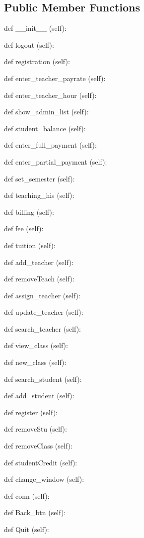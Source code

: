\subsection*{Public Member Functions}
\begin{DoxyCompactItemize}
\item 
def {\_\_init\_\_} (self):
\item 
def {logout} (self):
\item 
def {registration} (self):
\item 
def {enter\_teacher\_payrate} (self):
\item 
def {enter\_teacher\_hour} (self):
\item 
def {show\_admin\_list} (self):
\item 
def {student\_balance} (self):
\item 
def {enter\_full\_payment} (self):
\item 
def {enter\_partial\_payment} (self):
\item 
def {set\_semester} (self):
\item 
def {teaching\_his} (self):
\item 
def {billing} (self):
\item 
def {fee} (self):
\item 
def {tuition} (self):
\item 
def {add\_teacher} (self):
\item 
def {removeTeach} (self):
\item 
def {assign\_teacher} (self):
\item 
def {update\_teacher} (self):
\item 
def {search\_teacher} (self):
\item 
def {view\_class} (self):
\item 
def {new\_class} (self):
\item 
def {search\_student} (self):
\item 
def {add\_student} (self):
\item 
def {register} (self):
\item 
def {removeStu} (self):
\item 
def {removeClass} (self):
\item 
def {studentCredit} (self):
\item 
def {change\_window} (self):
\item 
def {conn} (self):
\item 
def {Back\_btn} (self):
\item 
def {Quit} (self):


\end{DoxyCompactItemize}

